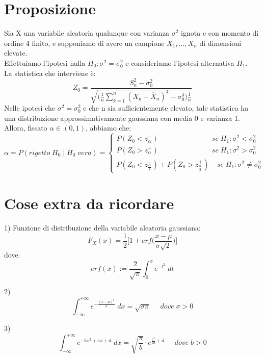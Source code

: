 \documentclass{article}
\begin{document}
\section*{Proposizione}
Sia X una variabile aleatoria qualunque con  varianza $\sigma^{2}$ ignota e con momento di ordine 4 finito, e supponiamo di avere un campione $X_{1},...,X_{n}$ di dimensioni elevate.\\
Effettuiamo l'ipotesi nulla $H_{0}: \sigma^{2} = \sigma^{2}_{0}$ e consideriamo l'ipotesi alternativa $H_{1}$.\\
La statistica che interviene è:
\[ Z_{0} = \frac{S_{n}^{2}-\sigma_{0}^{2}}{\sqrt{\Big(\frac{1}{n} \sum_{k=1}^{n}(X_{k}-\overline{X}_{n})^{4}-\sigma_{0}^{4} \Big) \frac{1}{n}}} \]
Nelle ipotesi che $\sigma^{2} = \sigma_{0}^{2}$ e che n sia sufficientemente elevato, tale statistica ha una distribuzione approssimativamente gaussiana con media 0 e varianza 1.
Allora, fissato $\alpha \in (0,1)$, abbiamo che:
\[ \alpha = P(rigetto \;  H_{0} \; | \; H_{0} \; vera) =
\begin{cases}
P(Z_{0} < z_{\alpha}^{-}) \; \; \; \; \; \; \; \; \; \; \; \; \; \; \; \; \; \; \; \; \; \; \; \; \; \; \; se \; H_{1}: \sigma^{2} < \sigma^{2}_{0}\\
P(Z_{0} > z_{\alpha}^{+}) \; \; \; \; \; \; \; \; \; \; \; \; \; \; \; \; \; \; \; \; \; \; \; \; \; \; \; se \; H_{1}: \sigma^{2} > \sigma^{2}_{0}\\
P(Z_{0} < z_{\frac{\alpha}{2}}^{-}) + P(Z_{0} > z_{\frac{\alpha}{2}}^{+}) \; \; \; \; se \; H_{1}: \sigma^{2} \neq \sigma^{2}_{0}
\end{cases}
\]

\section*{Cose extra da ricordare}
1) Funzione di distribuzione della variabile aleatoria gaussiana:
\[ F_{X}(x) = \frac{1}{2}\Big[1+erf\Big(\frac{x-\mu}{\sigma \sqrt{2}}\Big)\Big] \]
dove:
\[ erf(x) := \frac{2}{\sqrt{\pi}}\int_{0}^{x}e^{-t^{2}} \; dt \]

2)
\[ \int_{-\infty}^{+\infty} e^{- \frac{(x-\mu)^{2}}{\sigma}} \; dx = \sqrt{\sigma \pi} \; \; \; \; \; dove \; \sigma>0 \]

3)
\[ \int_{-\infty}^{+\infty} e^{-bx^{2}+cx+d} \; dx = \sqrt{\frac{\pi}{b}} \cdot e^{\frac{c^{2}}{4b}+d} \; \; \; \; \; dove \; b>0 \]
\end{document}

